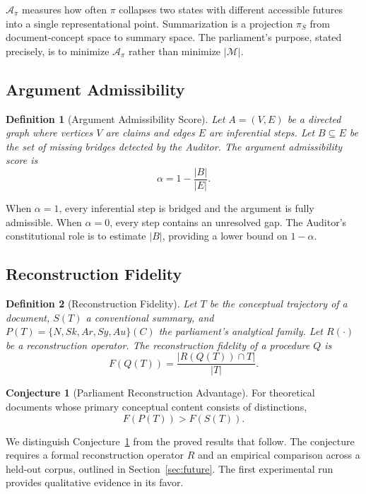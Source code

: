 \documentclass[12pt, a4paper]{article}
\newtheorem{definition}{Definition}[section]
\theoremstyle{principle}
\theoremstyle{definition}
\newtheorem{conjecture}{Conjecture}[section]
\begin{document}
$\mathcal{A}_\pi$ measures how often $\pi$ collapses two states with different
accessible futures into a single representational point. Summarization is a
projection $\pi_S$ from document-concept space to summary space. The parliament's
purpose, stated precisely, is to minimize $\mathcal{A}_\pi$ rather than
minimize $|\mathcal{M}|$.

\subsection{Argument Admissibility}

\begin{definition}[Argument Admissibility Score]
Let $A = (V, E)$ be a directed graph where vertices $V$ are claims and edges $E$
are inferential steps. Let $B \subseteq E$ be the set of missing bridges detected
by the Auditor. The \emph{argument admissibility score} is
\[
\alpha = 1 - \frac{|B|}{|E|}.
\]
\end{definition}

When $\alpha = 1$, every inferential step is bridged and the argument is fully
admissible. When $\alpha = 0$, every step contains an unresolved gap. The
Auditor's constitutional role is to estimate $|B|$, providing a lower bound on
$1 - \alpha$.

\subsection{Reconstruction Fidelity}

\begin{definition}[Reconstruction Fidelity]
Let $T$ be the conceptual trajectory of a document, $S(T)$ a conventional summary,
and $P(T) = \{N, Sk, Ar, Sy, Au\}(C)$ the parliament's analytical family.
Let $R(\cdot)$ be a reconstruction operator. The \emph{reconstruction fidelity}
of a procedure $Q$ is
\[
F(Q(T)) = \frac{|R(Q(T)) \cap T|}{|T|}.
\]
\end{definition}

\begin{conjecture}[Parliament Reconstruction Advantage]
\label{conj:reconstruction}
For theoretical documents whose primary conceptual content consists of distinctions,
\[
F(P(T)) > F(S(T)).
\]
\end{conjecture}

We distinguish Conjecture~\ref{conj:reconstruction} from the proved results that
follow. The conjecture requires a formal reconstruction operator $R$ and an empirical
comparison across a held-out corpus, outlined in Section~\ref{sec:future}. The first
experimental run provides qualitative evidence in its favor.
\end{document}
